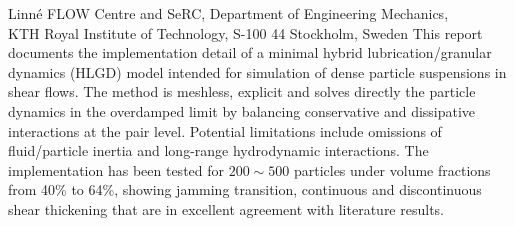 %
%
%
%
%
%
%
\paperaffiliation
{%
  Linn\'e FLOW Centre and SeRC, Department of Engineering Mechanics,\\
  KTH Royal Institute of Technology, S-100 44 Stockholm, Sweden%
}%
%
%
%
\papervolume{}%
%
\papernumber{}
%
\paperpages{}%
%
%
%
\papersummary%
{%
   This report documents the implementation detail of a minimal hybrid lubrication/granular dynamics (HLGD) model
   intended for simulation of dense particle suspensions in shear flows.
   The method is meshless, explicit and solves directly the particle dynamics in the overdamped limit
   by balancing conservative and dissipative interactions at the pair level.
   Potential limitations include omissions of fluid/particle inertia and long-range hydrodynamic interactions.
   The implementation has been tested for $200\sim 500$ particles under volume fractions from 40\% to 64\%,
   showing jamming transition, continuous and discontinuous shear thickening that are in excellent agreement with literature results.
}%
%
\graphicspath{{paper7/}}%
%
%
%
